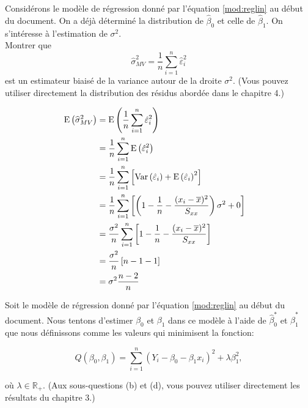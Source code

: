 \vspace{1cm}
\begin{questions}  

\vspace{1cm}
\question[10]

Considérons le modèle de régression donné par l'équation \eqref{mod:reglin} au début du document. On a déjà déterminé la distribution de $\widehat{\beta}_0$ et celle de $\widehat{\beta}_1$. On s'intéresse à l'estimation de $\sigma^2$. \\

Montrer que 
$$\hat\sigma_{MV}^2=\frac{1}{n}\sum\limits_{i=1}^n \hat\varepsilon_i^2$$ 
est un estimateur  biaisé de la variance autour de la droite $\sigma^2$. (Vous pouvez utiliser directement  la distribution des résidus abordée dans le chapitre 4.)


\begin{solution}
    \begin{align*}
            \mathrm{E}\left(\widehat{\sigma}_{MV}^2\right)
            &=\mathrm{E}\left(\frac{1}{n} \sum\limits_{i=1}^n \hat\varepsilon_i^2\right) \cr
            &= \frac{1}{n} \sum\limits_{i=1}^n \mathrm{E}\left(\hat\varepsilon_i^2\right) \cr
             &= \frac{1}{n} \sum\limits_{i=1}^n \left[ \mathrm{Var}\left(\hat\varepsilon_i\right) + \mathrm{E}\left(\hat\varepsilon_i\right)^2 \right]\cr
             &= \frac{1}{n} \sum\limits_{i=1}^n \left[ \left(1- \frac{1}{n} - \frac{(x_i - \overline{x})^2}{S_{xx}}\right)\sigma^2+ 0\right]\cr
             &= \frac{\sigma^2}{n} \sum\limits_{i=1}^n \left[ 1- \frac{1}{n} - \frac{(x_i - \overline{x})^2}{S_{xx}}\right]\cr
             &= \frac{\sigma^2}{n}  \left[ n- 1 - 1\right]\cr
             &= \sigma^2 \frac{n-2}{n}
        \end{align*}
\end{solution}

\vspace{2.5cm}
\question

Soit le modèle de régression donné par l'équation \eqref{mod:reglin} au début du document. Nous tentons d'estimer $\beta_0$ et $\beta_1$ dans ce modèle à l'aide de $\widehat{\beta}_0^*$ et $\widehat{\beta}_1^*$ que nous définissons comme les valeurs qui minimisent la fonction:

\begin{equation*}
   Q(\beta_0, \beta_1)= \sum_{i=1}^n(Y_i-\beta_0- \beta_1x_i)^2 + \lambda \beta_1 ^2,
\end{equation*}

où $\lambda \in \mathbb{R}_+$. (Aux sous-questions (b) et (d), vous pouvez utiliser directement  les résultats du chapitre 3.)
\begin{parts}

\end{parts}
\end{questions}
